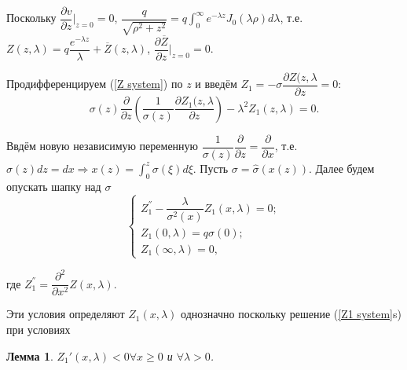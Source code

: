 \documentclass{article}
\newtheorem{lemma}{Лемма}
\newenvironment{proof}{\paragraph{Доказательство:}}{\hfill$\blacksquare$}
\begin{document}
Поскольку $\dfrac{\partial v}{\partial z} \bigg|_{z=0} = 0$, $\dfrac{q}{\sqrt{\rho^2 + z^2}} = q \int_0^{\infty} e^{-\lambda z} J_0(\lambda \rho) d \lambda$, т.е. $Z(z,\lambda) = q \dfrac{e^{-\lambda z}}{\lambda} + \overline{Z}(z, \lambda)$, $\dfrac{\partial \overline{Z}}{\partial z} \bigg|_{z=0} = 0$.

Продифференцируем (\ref{Z system}) по $z$ и введём $Z_1 = -\sigma \dfrac{\partial Z(z,\lambda}{\partial z} = 0$:
\begin{equation*}
	\sigma(z) \dfrac{\partial}{\partial z} \left( \dfrac{1}{\sigma(z)}\dfrac{\partial Z_1(z,\lambda}{\partial z} \right) - \lambda^2 Z_1(z,\lambda) =0.
\end{equation*}


Ввдём новую независимую переменную $ \dfrac{1}{\sigma(z)}\dfrac{\partial}{\partial z} = \dfrac{\partial}{\partial x}$, т.е. $\sigma(z) dz = dx \Rightarrow x(z) = \int_0^z \sigma(\xi) d\xi$. 
Пусть $\sigma = \hat{\sigma}(x(z))$. Далее будем опускать шапку над $\sigma$
\begin{equation}
\begin{cases}
	Z_1^{''} - \dfrac{\lambda}{\sigma^2(x)} Z_1(x,\lambda) = 0;\\
	Z_1(0,\lambda) = q\sigma(0);\\
	Z_1(\infty,\lambda) = 0,
\end{cases}
\label{Z1 system}
\end{equation}

где $Z_1^{''} = \dfrac{\partial^2}{\partial x^2} Z(x,\lambda)$.

Эти условия определяют $Z_1(x,\lambda)$ однозначно поскольку решение (\ref{Z1 system}s) при условиях

\begin{lemma}
	$Z_1'(x,\lambda) < 0 \forall x \geqslant 0$ и $ \forall \lambda > 0$.
\end{lemma}
\end{document}
